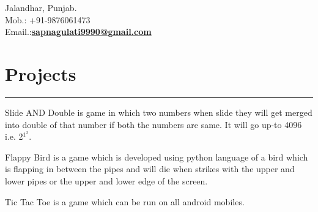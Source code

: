 \documentclass[]{sapna-resume}
\begin{document}
\begin{minipage}[t]{0.66\textwidth} 
\hspace*{0pt}\hfill    \\
\hspace*{0pt}\hfill    \\
\hspace*{0pt}\hfill Jalandhar, Punjab. \\
\hspace*{0pt}\hfill Mob.: +91-9876061473 \\
\hspace*{0pt}\hfill Email.:\textbf{\href{mailto:sapnagulati9990@gmail.com}{sapnagulati9990@gmail.com}}  
\section{Projects}
\noindent\rule{12.5cm}{0.4pt}
 
\noindent
\hspace{5em}%
\begin{minipage}{0.85\textwidth\vspace{2pt}}
Slide AND Double is game in which two numbers when slide they will get merged into double of that number if both the numbers are same. It will go up-to 4096 i.e. 2$^1^2$.
\end{minipage}
\sectionsep

 
\noindent
\hspace{5em}%
\begin{minipage}{0.85\textwidth\vspace{2pt}}
Flappy Bird is a game which is developed using python language of a bird which is flapping in between the pipes and will die when strikes with the upper and lower pipes or the upper and lower edge of the screen.
\end{minipage}
\sectionsep

 
\noindent
\hspace{5em}%
\begin{minipage}{0.85\textwidth\vspace{2pt}}
Tic Tac Toe is a game which can be run on all android mobiles.
\end{minipage}
\sectionsep


\end{minipage}
\end{document}
